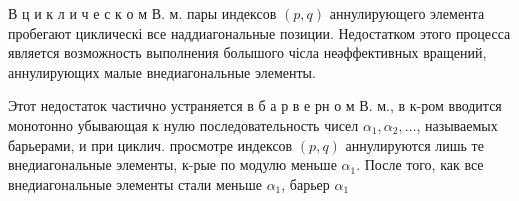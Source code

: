 \documentclass[10pt]{article}
\begin{document}
В ц и к л и ч е с к о м В. м. пары индексов $(p, q)$ аннулирующего элемента пробегают циклическі все наддиагональные позиции. Недостатком этого процесса является возможность выполнения болышого чісла неәффективных вращений, аннулирующих малые внедиагональные элементы.



Этот недостаток частично устраняется в б а р в е рн о м В. м., в к-ром вводится монотонно убывающая к нулю последовательность чисел $\alpha_{1}, \alpha_{2}, \ldots$, называемых барьерами, и при циклич. просмотре индексов $(p, q)$ аннулируются лишь те внедиагональные элементы, к-рые по модулю меньше $\alpha_{1}$. После того, как все внедиагональные элементы стали меньше $\alpha_{1}$, барьер $\alpha_{1}$
\end{document}
